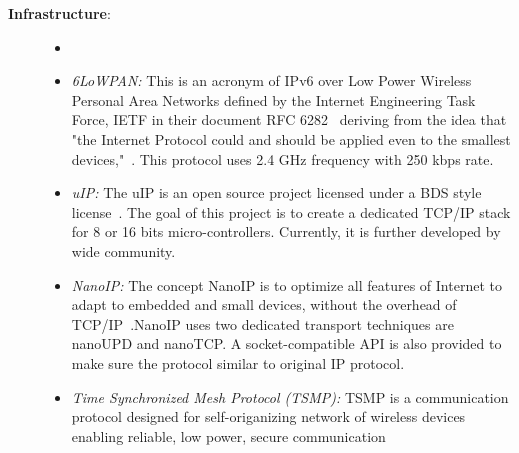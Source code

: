 \begin{description}
\item[\textbf{Infrastructure}:\\]
    \begin{itemize}
    \item[] 
    \item \textit{6LoWPAN: } This is an acronym of IPv6 over Low Power Wireless Personal Area Networks defined by the Internet Engineering Task Force, IETF in their document RFC 6282~\cite{shelby20116lowpan} deriving from the idea that "the Internet Protocol could and should be applied even to the smallest devices,"~\cite{Mulligan:2007:ARC:1278972.1278992}. This protocol uses 2.4 GHz frequency with 250 kbps rate.
    
    \item \textit{uIP: } The uIP is an open source project licensed under a BDS style license~\cite{adamdunk86:online}. The goal of this project is to create a dedicated TCP/IP stack for 8 or 16 bits micro-controllers. Currently, it is further developed by wide community.
    
    \item \textit{NanoIP: } The concept NanoIP is to optimize all features of Internet to adapt to embedded and small devices, without the overhead of TCP/IP~\cite{shelby2003nanoip}.NanoIP uses two dedicated transport techniques are nanoUPD and nanoTCP. A socket-compatible API is also provided to make sure the protocol similar to original IP protocol.
    
    \item \textit{Time Synchronized Mesh Protocol (TSMP): } TSMP is a communication protocol designed for self-origanizing network of wireless devices enabling reliable, low power, secure communication~\cite{pister2008tsmp} 
    
    \end{itemize}


\end{description}
